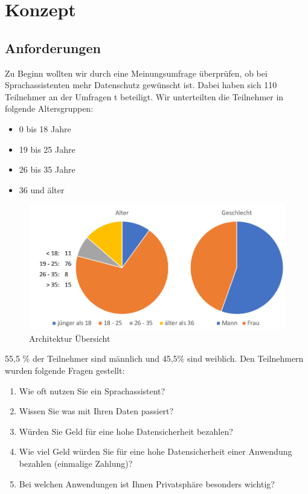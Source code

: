 \section{Konzept}\label{sec:konzept}

\subsection{Anforderungen}

Zu Beginn wollten wir durch eine Meinungsumfrage überprüfen, ob bei Sprachassistenten mehr Datenschutz gewünscht ist. Dabei haben sich 110 Teilnehmer an der Umfragen t beteiligt. Wir unterteilten die Teilnehmer in folgende Altersgruppen:

\begin{itemize}
	\item 0 bis 18 Jahre 
	\item 19 bis 25 Jahre
	\item 26 bis 35 Jahre
	\item 36 und älter	
\end{itemize}

\begin{figure}[h!]
	\centering
	\includegraphics[width=0.7\linewidth]{Picture/umfrage_teilnehmer}
	\caption[Architektur Übersicht]{Architektur Übersicht}
	\label{fig:umfrage_teilnehmer}
\end{figure}

55,5 \% der Teilnehmer sind männlich und 45,5\% sind weiblich. Den Teilnehmern wurden folgende Fragen gestellt:

\begin{enumerate}
	
	\item Wie oft nutzen Sie ein Sprachassistent?
	\item Wissen Sie was mit Ihren Daten passiert?
	\item Würden Sie Geld für eine hohe Datensicherheit bezahlen?
	\item Wie viel Geld würden Sie für eine hohe Datensicherheit einer Anwendung bezahlen (einmalige Zahlung)?
	\item Bei welchen Anwendungen ist Ihnen Privatsphäre besonders wichtig?
	
\end{enumerate}

